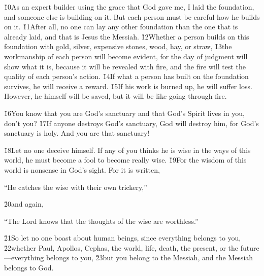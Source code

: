 \v{10}As an expert builder using the grace that God gave me, I laid the foundation, and someone else is building on it. But each person must be careful how he builds on it. \v{11}After all, no one can lay any other foundation than the one that is already laid, and that is Jesus the Messiah. \v{12}Whether a person builds on this foundation with gold, silver, expensive stones, wood, hay, or straw, \v{13}the workmanship of each person will become evident, for the day of judgment will show what it is, because it will be revealed with fire, and the fire will test the quality of each person's action. \v{14}If what a person has built on the foundation survives, he will receive a reward. \v{15}If his work is burned up, he will suffer loss. However, he himself will be saved, but it will be like going through fire.

\v{16}You know that you are God's sanctuary and that God's Spirit lives in you, don't you? \v{17}If anyone destroys God's sanctuary, God will destroy him, for God's sanctuary is holy. And you are that sanctuary!

\v{18}Let no one deceive himself. If any of you thinks he is wise in the ways of this world, he must become a fool to become really wise. \v{19}For the wisdom of this world is nonsense in God's sight. For it is written,

\begin{poetry}
\poeml ``He catches the wise with their own trickery,''
\end{poetry}

\v{20}and again,

\begin{poetry}
\poeml ``The Lord knows that the thoughts of the wise are worthless.''
\end{poetry}

\v{21}So let no one boast about human beings, since everything belongs to you, \v{22}whether Paul, Apollos, Cephas, the world, life, death, the present, or the future---everything belongs to you, \v{23}but you belong to the Messiah, and the Messiah belongs to God.

